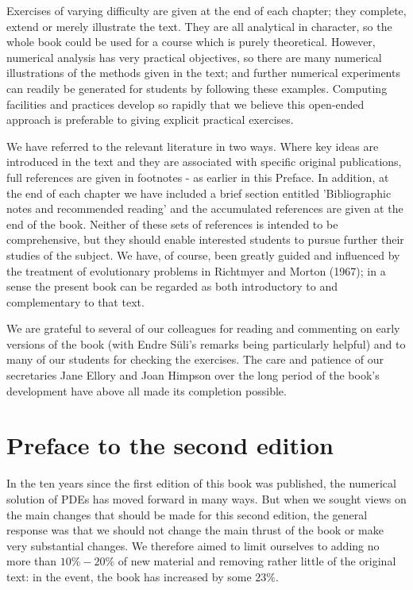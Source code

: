 \documentclass[10pt]{article}
\begin{document}
Exercises of varying difficulty are given at the end of each chapter; they complete, extend or merely illustrate the text. They are all analytical in character, so the whole book could be used for a course which is purely theoretical. However, numerical analysis has very practical objectives, so there are many numerical illustrations of the methods given in the text; and further numerical experiments can readily be generated for students by following these examples. Computing facilities and practices develop so rapidly that we believe this open-ended approach is preferable to giving explicit practical exercises.

We have referred to the relevant literature in two ways. Where key ideas are introduced in the text and they are associated with specific original publications, full references are given in footnotes - as earlier in this Preface. In addition, at the end of each chapter we have included a brief section entitled 'Bibliographic notes and recommended reading' and the accumulated references are given at the end of the book. Neither of these sets of references is intended to be comprehensive, but they should enable interested students to pursue further their studies of the subject. We have, of course, been greatly guided and influenced by the treatment of evolutionary problems in Richtmyer and Morton (1967); in a sense the present book can be regarded as both introductory to and complementary to that text.

We are grateful to several of our colleagues for reading and commenting on early versions of the book (with Endre Süli's remarks being particularly helpful) and to many of our students for checking the exercises. The care and patience of our secretaries Jane Ellory and Joan Himpson over the long period of the book's development have above all made its completion possible.

\section*{Preface to the second edition}
In the ten years since the first edition of this book was published, the numerical solution of PDEs has moved forward in many ways. But when we sought views on the main changes that should be made for this second edition, the general response was that we should not change the main thrust of the book or make very substantial changes. We therefore aimed to limit ourselves to adding no more than \(10 \%-20 \%\) of new material and removing rather little of the original text: in the event, the book has increased by some \(23 \%\).
\end{document}
